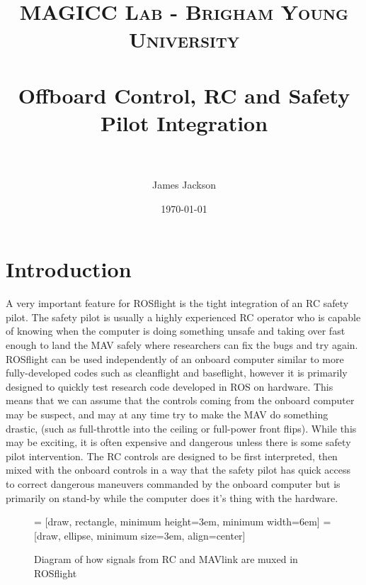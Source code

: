 \documentclass[paper=a4, fontsize=11pt]{scrartcl} %
\title{
\normalfont \normalsize
\textsc{MAGICC Lab - Brigham Young University} \\ [25pt] %
\horrule{0.5pt} \\[0.4cm] %
\huge Offboard Control, RC and Safety Pilot Integration \\ %
\horrule{2pt} \\[0.5cm] %
}
\author{James Jackson} %
\date{\normalsize\today} %
\begin{document}
\maketitle %


\section{Introduction}

A very important feature for ROSflight is the tight integration of an RC safety pilot.  The safety pilot is usually a highly experienced RC operator who is capable of knowing when the computer is doing something unsafe and taking over fast enough to land the MAV safely where researchers can fix the bugs and try again.  ROSflight can be used independently of an onboard computer similar to more fully-developed codes such as cleanflight and baseflight, however it is primarily designed to quickly test research code developed in ROS on hardware.  This means that we can assume that the controls coming from the onboard computer may be suspect, and may at any time try to make the MAV do something drastic, (such as full-throttle into the ceiling or full-power front flips).  While this may be exciting, it is often expensive and dangerous unless there is some safety pilot intervention.  The RC controls are designed to be first interpreted, then mixed with the onboard controls in a way that the safety pilot has quick access to correct dangerous maneuvers commanded by the onboard computer but is primarily on stand-by while the computer does it's thing with the hardware.

\begin{figure}[h!]
	\centering

	 = [draw, rectangle, 
    					minimum height=3em, minimum width=6em]
  =[draw, ellipse, minimum size=3em,
    					align=center]

	\label{mux_configuration}
	\caption{Diagram of how signals from RC and MAVlink are muxed in ROSflight}
\end{figure}
\end{document}
